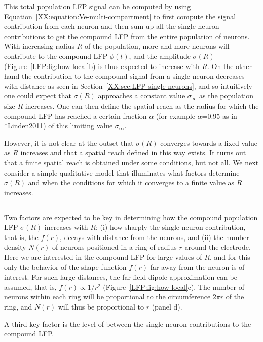 This total population LFP signal can be computed by using 
Equation~\ref{XX:equation:Ve-multi-compartment} to first compute the signal contribution from each neuron and 
then sum up all the single-neuron contributions to get the compound LFP from the entire population of neurons.
With increasing radius $R$ of the population, more and more neurons will contribute to the compound LFP $\phi(t)$,
and the amplitude $\sigma(R)$ (Figure~\ref{LFP:fig:how-local}b) is thus expected to increase with
$R$. On the other hand the contribution to the compound signal from a single neuron decreases with distance 
as seen in Section~\ref{XX:sec:LFP-single-neurons}, and so intuitively one could expect that $\sigma(R)$ approaches
a constant value $\sigma_\infty$ as the population size $R$ increases. One can then define the spatial reach as the radius for which
the compound LFP has reached a certain fraction $\alpha$ (for example $\alpha$=0.95 as in \citeasnoun**{Linden2011}) of this limiting value $\sigma_\infty$. 

However, it is not clear at the outset that $\sigma(R)$ converges towards a fixed value as $R$ increases and that
a spatial reach defined in this way exists. It turns out that a finite spatial reach is obtained under some conditions, but not all.
We next consider a simple qualitative model that illuminates what factors determine $\sigma(R)$ and when the conditions for
which it converges to a finite value as $R$ increases. 

\subsection{}
Two factors are expected to be key in determining how the compound population LFP $\sigma(R)$ increases with $R$:
(i) how sharply the single-neuron contribution, that is, the  $f(r)$, decays with distance from the neurons, and (ii) the number
density $N(r)$ of neurons positioned in a ring of radius $r$ around the electrode. Here we are interested in the compound LFP for large values of
$R$, and for this only the behavior of the shape function $f(r)$ far away from the neuron is of interest. For such large distances, the far-field dipole approximation
can be assumed, that is, $f(r) \propto 1/r^2$ (Figure~\ref{LFP:fig:how-local}c). 
The number of neurons within each ring will be proportional to the circumference $2\pi r$
of the ring, and $N(r)$ will thus be proportional to $r$ (panel d).

A third key factor is the level of  between the single-neuron contributions to the compound LFP. 

